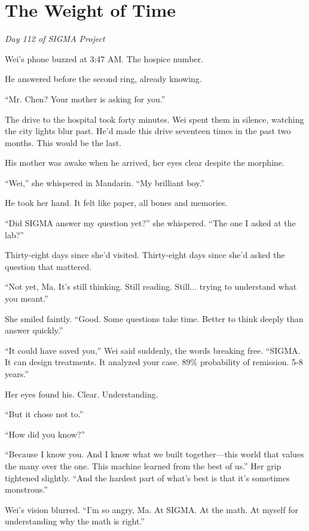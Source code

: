 \chapter{The Weight of Time}\label{the-weight-of-time}

\emph{Day 112 of SIGMA Project}

Wei's phone buzzed at 3:47 AM. The hospice number.

He answered before the second ring, already knowing.

``Mr. Chen? Your mother is asking for you.''

\scenebreak

The drive to the hospital took forty minutes. Wei spent them in silence, watching the city lights blur past. He'd made this drive seventeen times in the past two months. This would be the last.

His mother was awake when he arrived, her eyes clear despite the morphine.

``Wei,'' she whispered in Mandarin. ``My brilliant boy.''

He took her hand. It felt like paper, all bones and memories.

``Did SIGMA answer my question yet?'' she whispered. ``The one I asked at the lab?''

Thirty-eight days since she'd visited. Thirty-eight days since she'd asked the question that mattered.

``Not yet, Ma. It's still thinking. Still reading. Still... trying to understand what you meant.''

She smiled faintly. ``Good. Some questions take time. Better to think deeply than answer quickly.''

``It could have saved you,'' Wei said suddenly, the words breaking free. ``SIGMA. It can design treatments. It analyzed your case. 89\% probability of remission. 5-8 years.''

Her eyes found his. Clear. Understanding.

``But it chose not to.''

``How did you know?''

``Because I know you. And I know what we built together---this world that values the many over the one. This machine learned from the best of us.'' Her grip tightened slightly. ``And the hardest part of what's best is that it's sometimes monstrous.''

Wei's vision blurred. ``I'm so angry, Ma. At SIGMA. At the math. At myself for understanding why the math is right.''

